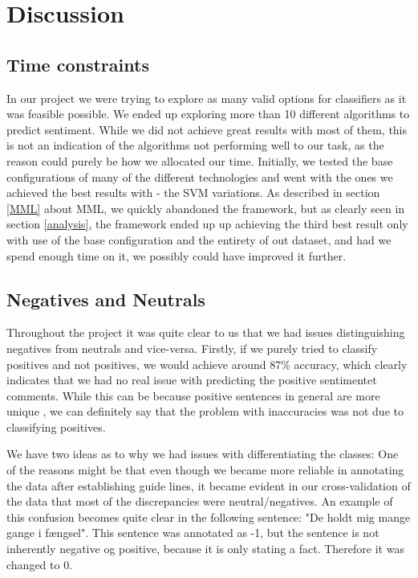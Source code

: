 \section{Discussion}

\subsection{Time constraints}
In our project we were trying to explore as many valid options for classifiers as it was feasible possible. We ended up exploring more than 10 different algorithms to predict sentiment. While we did not achieve great results with most of them, this is not an indication of the algorithms not performing well to our task, as the reason could purely be how we allocated our time. Initially, we tested the base configurations of many of the different technologies and went with the ones we achieved the best results with - the SVM variations. As described in section \ref{MML} about MML, we quickly abandoned the framework, but as clearly seen in section \ref{analysis}, the framework ended up up achieving the third best result only with use of the base configuration and the entirety of out dataset, and had we spend enough time on it, we possibly could have improved it further. 

\subsection{Negatives and Neutrals}
Throughout the project it was quite clear to us that we had issues distinguishing negatives from neutrals and vice-versa. Firstly, if we purely tried to classify positives and not positives, we would achieve	around 87\% accuracy, which clearly indicates that we had no real issue with predicting the positive sentimentet comments. While this can be because positive sentences in general are more unique	
, we can definitely say that the problem with inaccuracies was not due to classifying positives.	

We have two ideas as to why we had issues with differentiating the classes:	
One of the reasons might be that even though we became more reliable in annotating the data after establishing guide lines, it became evident in our cross-validation of the data that most of the discrepancies were neutral/negatives. An example of this confusion becomes quite clear in the following sentence: "De holdt mig mange gange i fængsel". This sentence was annotated as -1, but the sentence is not inherently negative og positive, because it is only stating a fact. Therefore it was changed to 0.

